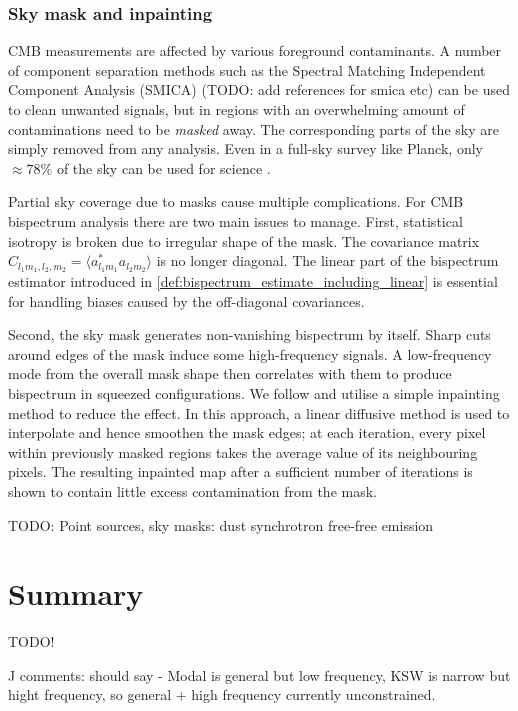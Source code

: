 \subsubsection*{Sky mask and inpainting}

CMB measurements are affected by various foreground contaminants. A number of component separation methods such as the Spectral Matching Independent Component Analysis (SMICA) (TODO: add references for smica etc) can be used to clean unwanted signals, but in regions with an overwhelming amount of contaminations need to be \textit{masked} away. The corresponding parts of the sky are simply removed from any analysis. Even in a full-sky survey like Planck, only $\approx 78\%$ of the sky can be used for science \cite{PlanckCollaboration2018component}.

Partial sky coverage due to masks cause multiple complications. For CMB bispectrum analysis there are two main issues to manage. First, statistical isotropy is broken due to irregular shape of the mask. The covariance matrix $C_{l_1 m_1, l_2, m_2} = \langle a^*_{l_1 m_1} a_{l_2 m_2} \rangle$ is no longer diagonal. The linear part of the bispectrum estimator introduced in \eqref{def:bispectrum_estimate_including_linear} is essential for handling biases caused by the off-diagonal covariances.

Second, the sky mask generates non-vanishing bispectrum by itself. Sharp cuts around edges of the mask induce some high-frequency signals. A low-frequency mode from the overall mask shape then correlates with them to produce bispectrum in squeezed configurations. We follow \cite{Gruetjen2017inpainting} and utilise a simple inpainting method to reduce the effect. In this approach, a linear diffusive method is used to interpolate and hence smoothen the mask edges; at each iteration, every pixel within previously masked regions takes the average value of its neighbouring pixels. The resulting inpainted map after a sufficient number of iterations is shown to contain little excess contamination from the mask. 

TODO: Point sources, sky masks: dust synchrotron free-free emission


\section{Summary}
TODO!

J comments: should say - Modal is general but low frequency, KSW is narrow but hight frequency, so general + high frequency currently unconstrained.